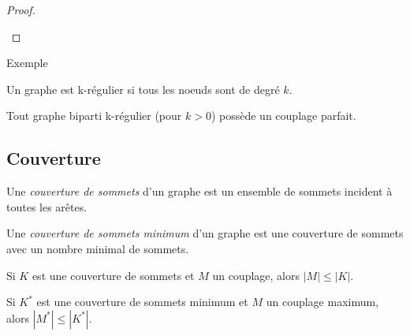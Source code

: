 \begin{mytheo} 
\begin{proof}
\begin{center}
\end{center}

  \end{proof}
\end{mytheo}
\begin{myexem}
  Exemple \addTODO
\end{myexem}

\begin{myrem}
  Un graphe est k-régulier si tous les noeuds sont de degré $k$.
\end{myrem}

\begin{mycorr}
  Tout graphe biparti k-régulier (pour $k > 0$) possède un couplage parfait.
\end{mycorr}

\subsection{Couverture}
\begin{mydef}
  Une \emph{couverture de sommets} d’un graphe est un ensemble de sommets incident à toutes les arêtes.
\end{mydef}

\begin{mydef}
  Une \emph{couverture de sommets minimum} d’un graphe est une couverture de sommets avec un nombre minimal de sommets.
\end{mydef}

\begin{myrem}
  Si $K$ est une couverture de sommets et $M$ un couplage, alors $|M| \leq |K|$.
\end{myrem}

\begin{myrem}
  Si $K^*$ est une couverture de sommets minimum et $M$ un couplage maximum, alors $|M^*| \leq |K^*|$.
\end{myrem}

